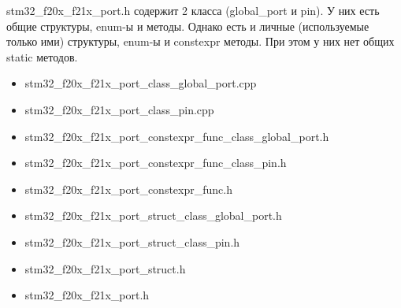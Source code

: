 \begin{enumerate}
	stm32\_f20x\_f21x\_port.h содержит 2 класса (global\_port и pin). У них есть общие структуры, enum-ы и методы. Однако есть и личные (используемые только ими) структуры, enum-ы и constexpr методы. При этом у них нет общих static методов.
	\begin{itemize}
		\item stm32\_f20x\_f21x\_port\_class\_global\_port.cpp
		\item stm32\_f20x\_f21x\_port\_class\_pin.cpp 
		\item stm32\_f20x\_f21x\_port\_constexpr\_func\_class\_global\_port.h
		\item stm32\_f20x\_f21x\_port\_constexpr\_func\_class\_pin.h
		\item stm32\_f20x\_f21x\_port\_constexpr\_func.h
		\item stm32\_f20x\_f21x\_port\_struct\_class\_global\_port.h
		\item stm32\_f20x\_f21x\_port\_struct\_class\_pin.h
		\item stm32\_f20x\_f21x\_port\_struct.h
		\item stm32\_f20x\_f21x\_port.h
	\end{itemize}
\end{enumerate}